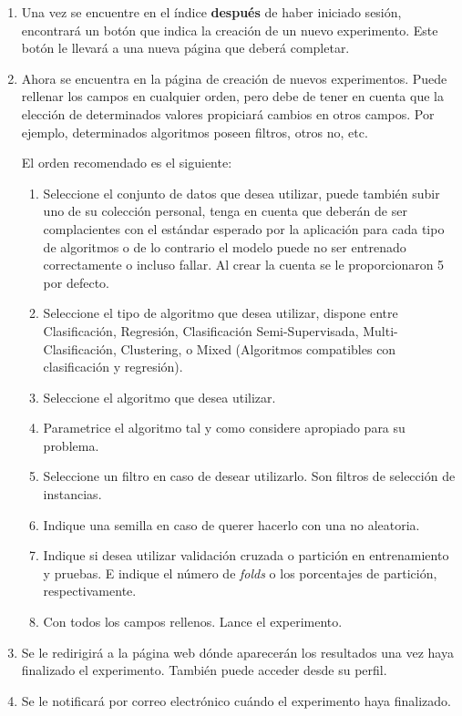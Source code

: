 \documentclass[
	12pt,
	spanish
]{article}
\begin{document}
\begin{enumerate}
\item Una vez se encuentre en el índice \textbf{después} de haber iniciado sesión, encontrará un botón que indica la creación de un nuevo experimento. Este botón le llevará a una nueva página que deberá completar.
\item Ahora se encuentra en la página de creación de nuevos experimentos. Puede rellenar los campos en cualquier orden, pero debe de tener en cuenta que la elección de determinados valores propiciará cambios en otros campos. Por ejemplo, determinados algoritmos poseen filtros, otros no, etc.

El orden recomendado es el siguiente:
\begin{enumerate}
\item Seleccione el conjunto de datos que desea utilizar, puede también subir uno de su colección personal, tenga en cuenta que deberán de ser complacientes con el estándar esperado por la aplicación para cada tipo de algoritmos o de lo contrario el modelo puede no ser entrenado correctamente o incluso fallar. Al crear la cuenta se le proporcionaron 5 por defecto.
\item Seleccione el tipo de algoritmo que desea utilizar, dispone entre Clasificación, Regresión, Clasificación Semi-Supervisada, Multi-Clasificación, Clustering, o Mixed (Algoritmos compatibles con clasificación y regresión).
\item Seleccione el algoritmo que desea utilizar.
\item Parametrice el algoritmo tal y como considere apropiado para su problema.
\item Seleccione un filtro en caso de desear utilizarlo. Son filtros de selección de instancias.
\item Indique una semilla en caso de querer hacerlo con una no aleatoria. 
\item Indique si desea utilizar validación cruzada o partición en entrenamiento y pruebas. E indique el número de \textit{folds} o los porcentajes de partición, respectivamente.
\item Con todos los campos rellenos. Lance el experimento.
\end{enumerate}
\item Se le redirigirá a la página web dónde aparecerán los resultados una vez haya finalizado el experimento. También puede acceder desde su perfil.
\item Se le notificará por correo electrónico cuándo el experimento haya finalizado.
\end{enumerate}
\end{document}
